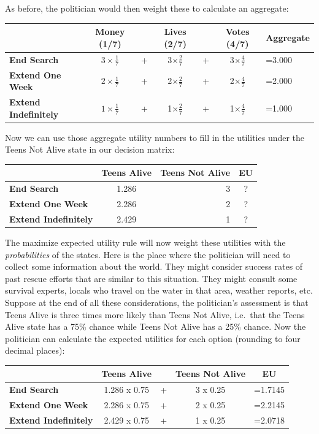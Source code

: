 \documentclass[]{tufte-book}
\begin{document}
As before, the politician would then weight these to calculate an aggregate:

\begin{longtable}[]{@{}lclclcl@{}}
\toprule
& Money (1/7) & & Lives (2/7) & & Votes (4/7) & Aggregate\tabularnewline
\midrule
\endhead
\textbf{End Search} & \(3\times \frac{1}{7}\) & + & 3\(\times \frac{2}{7}\) & + & 3\(\times \frac{4}{7}\) & =3.000\tabularnewline
\textbf{Extend One Week} & \(2\times \frac{1}{7}\) & + & 2\(\times \frac{2}{7}\) & + & 2\(\times \frac{4}{7}\) & =2.000\tabularnewline
\textbf{Extend Indefinitely} & \(1\times \frac{1}{7}\) & + & 1\(\times \frac{2}{7}\) & + & 1\(\times \frac{4}{7}\) & =1.000\tabularnewline
\bottomrule
\end{longtable}

Now we can use those aggregate utility numbers to fill in the utilities under the Teens Not Alive state in our decision matrix:

\begin{longtable}[]{@{}lcrc@{}}
\toprule
& Teens Alive & Teens Not Alive & EU\tabularnewline
\midrule
\endhead
\textbf{End Search} & 1.286 & 3 & ?\tabularnewline
\textbf{Extend One Week} & 2.286 & 2 & ?\tabularnewline
\textbf{Extend Indefinitely} & 2.429 & 1 & ?\tabularnewline
\bottomrule
\end{longtable}

The maximize expected utility rule will now weight these utilities with the \emph{probabilities} of the states. Here is the place where the politician will need to collect some information about the world. They might consider success rates of past rescue efforts that are similar to this situation. They might consult some survival experts, locals who travel on the water in that area, weather reports, etc. Suppose at the end of all these considerations, the politician's assessment is that Teens Alive is three times more likely than Teens Not Alive, i.e.~that the Teens Alive state has a 75\% chance while Teens Not Alive has a 25\% chance. Now the politician can calculate the expected utilities for each option (rounding to four decimal places):

\begin{longtable}[]{@{}lclcc@{}}
\toprule
& Teens Alive & & Teens Not Alive & EU\tabularnewline
\midrule
\endhead
\textbf{End Search} & 1.286 x 0.75 & + & 3 x 0.25 & =1.7145\tabularnewline
\textbf{Extend One Week} & 2.286 x 0.75 & + & 2 x 0.25 & =2.2145\tabularnewline
\textbf{Extend Indefinitely} & 2.429 x 0.75 & + & 1 x 0.25 & =2.0718\tabularnewline
\bottomrule
\end{longtable}
\end{document}
